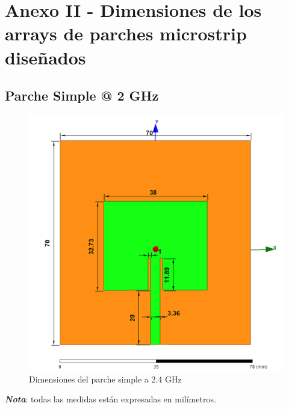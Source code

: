 
\chapter{Anexo II - Dimensiones de los arrays de parches microstrip diseñados}
\label{anexo}


\section{Parche Simple @ 2 GHz}

\vfill
\begin{figure}[H]
   	 \centering
        \includegraphics[width=\textwidth ,height=\textheight, keepaspectratio=true]{archivos/desarrollo/autocad/1}
        \caption{Dimensiones del parche simple a 2.4 GHz}
        \label{fig:simple1}
\end{figure}
\vfill
\textit{\textbf{Nota}}: todas las medidas están expresadas en milímetros.
\newpage


